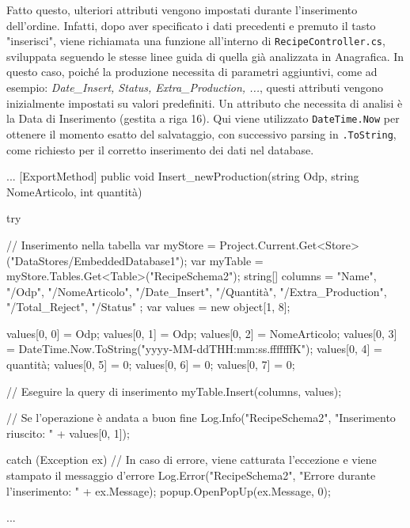 Fatto questo, ulteriori attributi vengono impostati durante l'inserimento dell'ordine. Infatti, dopo aver specificato i dati precedenti e premuto il tasto "inserisci", viene richiamata una funzione all'interno di \verb|RecipeController.cs|, sviluppata seguendo le stesse linee guida di quella già analizzata in Anagrafica. In questo caso, poiché la produzione necessita di parametri aggiuntivi, come ad esempio: \textit{Date\_Insert, Status, Extra\_Production, ...}, questi attributi vengono inizialmente impostati su valori predefiniti. Un attributo che necessita di analisi è la Data di Inserimento (gestita a riga 16). Qui viene utilizzato \verb|DateTime.Now| per ottenere il momento esatto del salvataggio, con successivo parsing in \verb|.ToString|, come richiesto per il corretto inserimento dei dati nel database.

\begin{csharp}
...
[ExportMethod]
public void Insert_newProduction(string Odp, string NomeArticolo, int quantità)   
{
    try
    {
        // Inserimento nella tabella
        var myStore = Project.Current.Get<Store>("DataStores/EmbeddedDatabase1");
        var myTable = myStore.Tables.Get<Table>("RecipeSchema2");
        string[] columns = { "Name", "/Odp", "/NomeArticolo", "/Date_Insert", "/Quantità", "/Extra_Production", "/Total_Reject", "/Status" };
        var values = new object[1, 8];

        values[0, 0] = Odp;
        values[0, 1] = Odp;
        values[0, 2] = NomeArticolo;
        values[0, 3] = DateTime.Now.ToString("yyyy-MM-ddTHH:mm:ss.fffffffK"); 
        values[0, 4] = quantità;
        values[0, 5] = 0;
        values[0, 6] = 0;
        values[0, 7] = 0;

        // Eseguire la query di inserimento
        myTable.Insert(columns, values);

        // Se l'operazione è andata a buon fine
        Log.Info("RecipeSchema2", "Inserimento riuscito: " + values[0, 1]);
    }
    catch (Exception ex)
    {
        // In caso di errore, viene catturata l'eccezione e viene stampato il messaggio d'errore
        Log.Error("RecipeSchema2", "Errore durante l'inserimento: " + ex.Message);
        popup.OpenPopUp(ex.Message, 0);
    }
}
...
\end{csharp}


